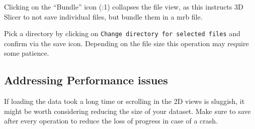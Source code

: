 Clicking on the ``Bundle'' icon (:1) collapses the file view, as this instructs 3D Slicer to not save individual files, but bundle them in a \Gls{mrb} file.

Pick a directory by clicking on \texttt{Change directory for selected files} and confirm via the save icon.
Depending on the file size this operation may require some patience.

\pagebreak

\subsection{Addressing Performance issues}
If loading the data took a long time or scrolling in the 2D views is sluggish, %
it might be worth considering reducing the size of your dataset.
Make sure to save after every operation to reduce the loss of progress in case of a crash.

